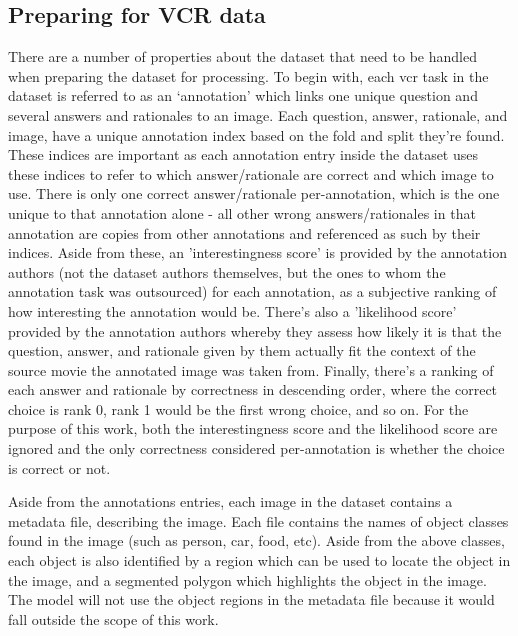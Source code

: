 \subsection{Preparing for VCR data}
\label{subsec:preparing_the_vcr_data}

There are a number of properties about the dataset that need to be handled when preparing the dataset for processing.
To begin with, each \gls{vcr} task in the dataset is referred to as an `annotation' which links one unique question and several answers and rationales to an image.
Each question, answer, rationale, and image, have a unique annotation index based on the fold and split they're found.
These indices are important as each annotation entry inside the dataset uses these indices to refer to which answer/rationale are correct and which image to use.
There is only one correct answer/rationale per-annotation, which is the one unique to that annotation alone - all other wrong answers/rationales in that annotation are copies from other annotations and referenced as such by their indices.
Aside from these, an 'interestingness score' is provided by the annotation authors (not the dataset authors themselves, but the ones to whom the annotation task was outsourced) for each annotation, as a subjective ranking of how interesting the annotation would be.
There's also a 'likelihood score' provided by the annotation authors whereby they assess how likely it is that the question, answer, and rationale given by them actually fit the context of the source movie the annotated image was taken from.
Finally, there's a ranking of each answer and rationale by correctness in descending order, where the correct choice is rank 0, rank 1 would be the first wrong choice, and so on.
For the purpose of this work, both the interestingness score and the likelihood score are ignored and the only correctness considered per-annotation is whether the choice is correct or not.

Aside from the annotations entries, each image in the dataset contains a metadata file, describing the image.
Each file contains the names of object classes found in the image (such as person, car, food, etc).
Aside from the above classes, each object is also identified by a region which can be used to locate the object in the image, and a segmented polygon which highlights the object in the image.
The model will not use the object regions in the metadata file because it would fall outside the scope of this work.

